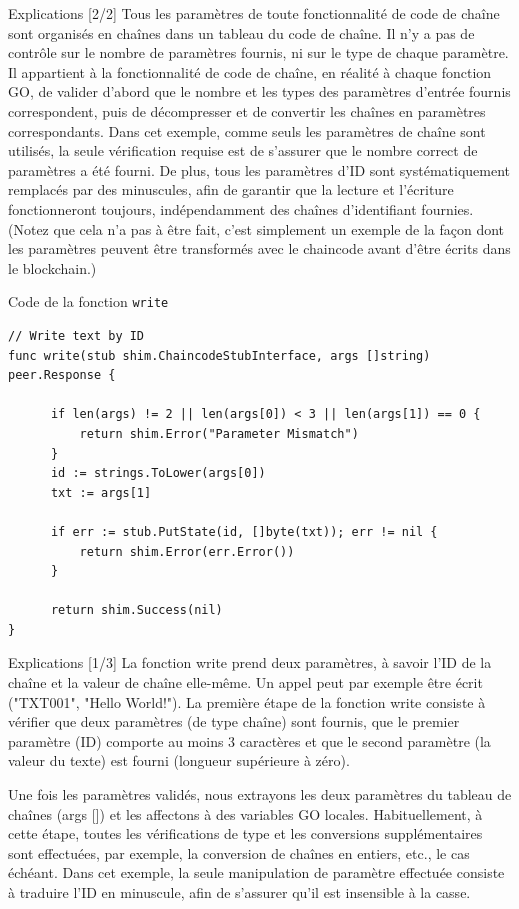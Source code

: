 \documentclass[presentation]{beamer}
\begin{document}
\begin{frame}[label={sec:org3b6843d}]{Explications [2/2]}
Tous les paramètres de toute fonctionnalité de code de chaîne sont organisés en chaînes 
dans un tableau du code de chaîne. Il n'y a pas de contrôle sur le nombre de paramètres 
fournis, ni sur le type de chaque paramètre. Il appartient à la fonctionnalité de code 
de chaîne, en réalité à chaque fonction GO, de valider d’abord que le nombre et les 
types des paramètres d’entrée fournis correspondent, puis de décompresser et de convertir 
les chaînes en paramètres correspondants. Dans cet exemple, comme seuls les paramètres de 
chaîne sont utilisés, la seule vérification requise est de s'assurer que le nombre correct 
de paramètres a été fourni. De plus, tous les paramètres d'ID sont systématiquement remplacés 
par des minuscules, afin de garantir que la lecture et l'écriture fonctionneront toujours, 
indépendamment des chaînes d'identifiant fournies. (Notez que cela n’a pas à être fait, c’est
simplement un exemple de la façon dont les paramètres peuvent être transformés avec le chaincode 
avant d’être écrits dans le blockchain.)
\end{frame}
\begin{frame}[fragile,label={sec:orga252e1c}]{Code de la fonction \texttt{write}}
 \begin{verbatim}
// Write text by ID
func write(stub shim.ChaincodeStubInterface, args []string) peer.Response {

      if len(args) != 2 || len(args[0]) < 3 || len(args[1]) == 0 {
	      return shim.Error("Parameter Mismatch")
      }
      id := strings.ToLower(args[0])
      txt := args[1]

      if err := stub.PutState(id, []byte(txt)); err != nil {
	      return shim.Error(err.Error())
      }

      return shim.Success(nil)
}
\end{verbatim}
\end{frame}
\begin{frame}[label={sec:org6875754}]{Explications [1/3]}
La fonction write prend deux paramètres, à savoir l'ID de la chaîne et la valeur de chaîne elle-même. 
Un appel peut par exemple être écrit ("TXT001", "Hello World!"). 
La première étape de la fonction write consiste à vérifier que deux paramètres (de type chaîne) sont 
fournis, que le premier paramètre (ID) comporte au moins 3 caractères et que le second paramètre (la 
valeur du texte) est fourni (longueur supérieure à zéro).

Une fois les paramètres validés, nous extrayons les deux paramètres du tableau de chaînes (args [])
et les affectons à des variables GO locales. Habituellement, à cette étape, toutes les vérifications 
de type et les conversions supplémentaires sont effectuées, par exemple, la conversion de chaînes en 
entiers, etc., le cas échéant. Dans cet exemple, la seule manipulation de paramètre effectuée consiste 
à traduire l'ID en minuscule, afin de s'assurer qu'il est insensible à la casse.
\end{frame}
\end{document}
